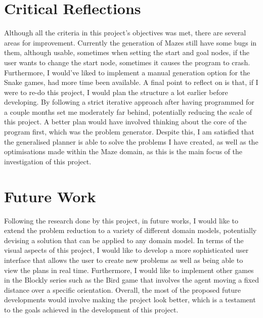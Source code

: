 \section{Critical Reflections}
Although all the criteria in this project's objectives was met, there are several areas for improvement. Currently the generation of Mazes still have some bugs in them, although usable, sometimes when setting the start and goal nodes, if the user wants to change the start node, sometimes it causes the program to crash. Furthermore, I would've liked to implement a manual generation option for the Snake games, had more time been available.  A final point to reflect on is that, if I were to re-do this project, I would plan the structure a lot earlier before developing. By following a strict iterative approach after having programmed for a couple months set me moderately far behind, potentially reducing the scale of this project. A better plan would have involved thinking about the core of the program first, which was the problem generator. Despite this, I am satisfied that the generalised planner is able to solve the problems I have created, as well as the optimisations made within the Maze domain, as this is the main focus of the investigation of this project.

\section{Future Work}
Following the research done by this project, in future works, I would like to extend the problem reduction to a variety of different domain models, potentially devising a solution that can be applied to any domain model. In terms of the visual aspects of this project, I would like to develop a more sophisticated user interface that allows the user to create new problems as well as being able to view the plans in real time. Furthermore, I would like to implement other games in the Blockly series such as the Bird game that involves the agent moving a fixed distance over a specific orientation. Overall, the most of the proposed future developments would involve making the project look better, which is a testament to the goals achieved in the development of this project.